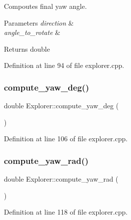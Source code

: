 Compoutes final yaw angle. 


\begin{DoxyParams}{Parameters}
{\em direction} & \\
\hline
{\em angle\+\_\+to\+\_\+rotate} & \\
\hline
\end{DoxyParams}
\begin{DoxyReturn}{Returns}
double 
\end{DoxyReturn}


Definition at line 94 of file explorer.\+cpp.

\mbox{\label{class_explorer_a670cdffdb8c3173c300590cfc45ab6d2}} 
\subsubsection{\texorpdfstring{compute\+\_\+yaw\+\_\+deg()}{compute\_yaw\_deg()}}
{\footnotesize\ttfamily double Explorer\+::compute\+\_\+yaw\+\_\+deg (\begin{DoxyParamCaption}{ }\end{DoxyParamCaption})}



Definition at line 106 of file explorer.\+cpp.

\mbox{\label{class_explorer_ac5b91cd64189a60ffe62535cb5bc093a}} 
\subsubsection{\texorpdfstring{compute\+\_\+yaw\+\_\+rad()}{compute\_yaw\_rad()}}
{\footnotesize\ttfamily double Explorer\+::compute\+\_\+yaw\+\_\+rad (\begin{DoxyParamCaption}{ }\end{DoxyParamCaption})}



Definition at line 118 of file explorer.\+cpp.

\mbox{\label{class_explorer_ac3a5c9368647dd9d2c36d12497bd889e}} 
